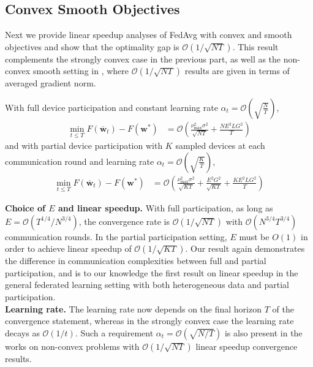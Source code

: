 \subsection{Convex Smooth Objectives}
Next we provide linear speedup analyses of FedAvg with convex and
smooth objectives and show that the optimality gap is $\mathcal{O}(1/\sqrt{NT})$. 
This result complements the strongly convex case in the previous part, as well as the non-convex
smooth setting in \cite{jiang2018linear,yu2019parallel,haddadpour2019convergence},
where $\mathcal{O}(1/\sqrt{NT})$ results are given in terms of averaged
gradient norm. 
\begin{theorem}
	\label{thm:SGD_cvx}With full device participation and constant learning
	rate $\alpha_{t}=\mathcal{O}(\sqrt{\frac{N}{T}})$, 
	\begin{align*}
	\min_{t\leq T}F(\overline{\mathbf{w}}_{t})-F(\mathbf{w}^{\ast}) & =\mathcal{O}\left(\frac{\nu_{\max}^{2}\sigma^{2}}{\sqrt{NT}}+\frac{NE^{2}LG^{2}}{T}\right)
	\end{align*}
	and with partial device participation with $K$ sampled devices at
	each communication round and learning rate $\alpha_{t}=\mathcal{O}(\sqrt{\frac{K}{T}})$,
	\begin{align*}
	\min_{t\leq T}F(\overline{\mathbf{w}}_{t})-F(\mathbf{w}^{\ast}) & =\mathcal{O}\left(\frac{\nu_{\max}^{2}\sigma^{2}}{\sqrt{KT}}+\frac{E^{2}G^{2}}{\sqrt{KT}}+\frac{KE^{2}LG^{2}}{T}\right)
	\end{align*}
\end{theorem}
%
\textbf{Choice of $E$ and linear speedup. }With full participation,
as long as $E=\mathcal{O}(T^{1/4}/N^{3/4})$, the convergence
rate is $\mathcal{O}(1/\sqrt{NT})$ with $\mathcal{O}(N^{3/4}T^{3/4})$
communication rounds. In the partial participation setting, $E$ must
be $O(1)$ in order to achieve linear speedup of $\mathcal{O}(1/\sqrt{KT})$.
Our result again demonstrates the difference in communication complexities
between full and partial participation, and is to our knowledge the
first result on linear speedup in the general federated learning setting
with both heterogeneous data and partial participation. \\
\textbf{Learning rate. }The learning rate now depends on the final
horizon $T$ of the convergence statement, whereas in the strongly
convex case the learning rate decays as $\mathcal{O}(1/t)$. Such
a requirement $\alpha_{t}=\mathcal{O}(\sqrt{N/T})$ is also present
in the works \cite{haddadpour2019convergence,yu2019parallel} on non-convex
problems with $\mathcal{O}(1/\sqrt{NT})$ linear speedup convergence results. 